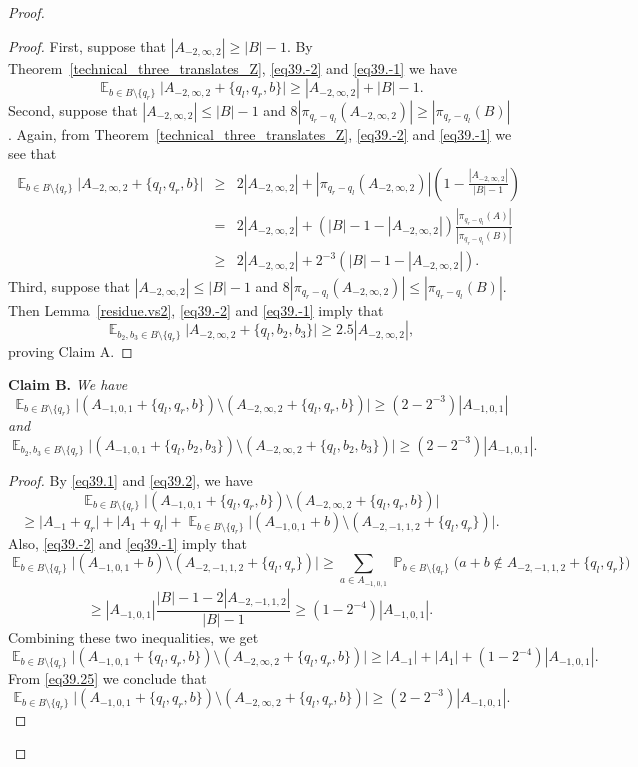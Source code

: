 \documentclass[12pt,reqno]{amsart}
\DeclareMathOperator*{\E}{\mathbb{E}}
\DeclareMathOperator*{\Prob}{\mathbb{P}}
\theoremstyle{definition}
\renewcommand\leq{\leqslant}
\renewcommand\geq{\geqslant}
\renewcommand\ge{\geqslant}
\begin{document}
\begin{proof}
\begin{proof}
\vspace{5pt}
First, suppose that $|A_{-2,\infty,2}|\geq |B|-1$. By Theorem~\ref{technical_three_translates_Z},  \eqref{eq39.-2} and \eqref{eq39.-1} we have
$$\E_{b\in B \setminus \{q_r\}}\bigg|A_{-2,\infty,2}+\{q_l,q_r, b\} \bigg|  \ge |A_{-2,\infty,2}|+|B|-1.$$
Second, suppose that $|A_{-2,\infty,2}|\leq |B|-1$ and $8|\pi_{q_r-q_l}(A_{-2,\infty,2})| \geq  |\pi_{q_r-q_l}(B)|$. Again, from Theorem~\ref{technical_three_translates_Z},  \eqref{eq39.-2} and \eqref{eq39.-1} we see that
\begin{eqnarray*}
        \E_{b\in B \setminus \{q_r\}}\bigg|A_{-2,\infty,2}+\{q_l,q_r, b\} \bigg| &\ge& 2|A_{-2,\infty,2}|+|\pi_{q_r-q_l}(A_{-2,\infty,2})|(1-\frac{|A_{-2,\infty,2}|}{|B|-1})\\
        &=&2|A_{-2,\infty,2}|+(|B|-1-|A_{-2,\infty,2}|)\frac{|\pi_{q_r-q_l}(A)|}{|\pi_{q_r-q_l}(B)|}\\
        &\geq& 2|A_{-2,\infty,2}|+2^{-3}(|B|-1-|A_{-2,\infty,2}|).
\end{eqnarray*}
Third, suppose that $|A_{-2,\infty,2}|\leq |B|-1$ and $8|\pi_{q_r-q_l}(A_{-2,\infty,2})| \leq  |\pi_{q_r-q_l}(B)|$. Then Lemma~\ref{residue.vs2},  \eqref{eq39.-2} and \eqref{eq39.-1} imply that
\begin{equation*}
       \E_{b_2,b_3\in B \setminus \{q_r\}}\bigg|A_{-2,\infty,2}+\{q_l,b_2, b_3\} \bigg|  \ge 2.5|A_{-2,\infty,2}|,
\end{equation*}
proving Claim A.
\end{proof}

\vspace{7pt}
{\bf Claim B. }{\em
We have
$$  \E_{b\in B \setminus \{q_r\}}\bigg|(A_{-1,0,1}+\{q_l,q_r, b\}) \setminus ( A_{-2,\infty,2}+\{q_l,q_r, b\} ) \bigg| \geq (2-2^{-3})|A_{-1,0,1}|$$
and
$$  \E_{b_2,b_3\in B \setminus \{q_r\}}\bigg|(A_{-1,0,1}+\{q_l,b_2, b_3\}) \setminus ( A_{-2,\infty,2}+\{q_l,b_2, b_3\} ) \bigg| \geq (2-2^{-3})|A_{-1,0,1}|.$$
}
\begin{proof}
By \eqref{eq39.1} and \eqref{eq39.2}, we have
\[
\E_{b\in B \setminus \{q_r\}}\bigg|(A_{-1,0,1}+\{q_l,q_r, b\}) \setminus ( A_{-2,\infty,2}+\{q_l,q_r, b\} ) \bigg|
\]
 \[
\geq \bigg|A_{-1}+q_r\bigg|+ \bigg|A_{1}+q_l\bigg|+ \E_{b\in B \setminus \{q_r\}}\bigg|(A_{-1,0,1}+b) \setminus  (A_{-2,-1,1,2}+\{q_l,q_r\})\bigg|.
\]
Also, \eqref{eq39.-2} and \eqref{eq39.-1} imply that
\[
        \E_{b\in B \setminus \{q_r\}}\bigg|(A_{-1,0,1}+b) \setminus (A_{-2,-1,1,2}+\{q_l,q_r\})\bigg| \geq \sum_{a\in A_{-1,0,1}} \Prob_{b\in B \setminus \{q_r\}} \bigg(a+b \not\in A_{-2,-1,1,2}+\{q_l,q_r\} \bigg)
\]
\[
\geq |A_{-1,0,1}| \frac{|B|-1-2|A_{-2,-1,1,2}|}{|B|-1}
        \geq (1-2^{-4})|A_{-1,0,1}|.
\]
Combining these two inequalities, we get
\[
\E_{b\in B \setminus \{q_r\}}\bigg|(A_{-1,0,1}+\{q_l,q_r, b\}) \setminus ( A_{-2,\infty,2}+\{q_l,q_r, b\} ) \bigg| \geq |A_{-1}|+|A_1|+(1-2^{-4})|A_{-1,0,1}|.
\]
From \eqref{eq39.25} we conclude that
\[
  \E_{b\in B \setminus \{q_r\}}\bigg|(A_{-1,0,1}+\{q_l,q_r, b\}) \setminus ( A_{-2,\infty,2}+\{q_l,q_r, b\} ) \bigg| \geq (2-2^{-3})|A_{-1,0,1}|.
\]


\end{proof}
\end{proof}
\end{document}
